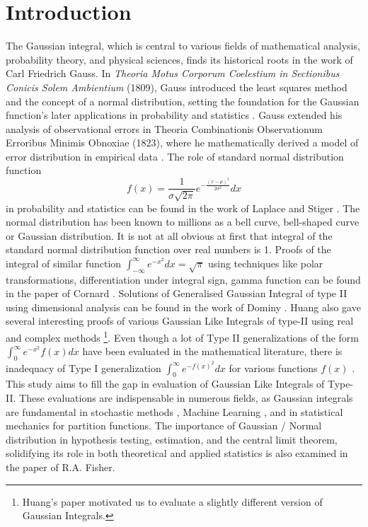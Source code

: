 \documentclass[a4paper,twoside,10pt]{article}
\begin{document}
\section{Introduction}
The Gaussian integral, which is central to various fields of mathematical analysis, probability theory, and physical sciences, finds its historical roots in the work of Carl Friedrich Gauss. In \textit{Theoria Motus Corporum Coelestium in Sectionibus Conicis Solem Ambientium} (1809), Gauss introduced the least squares method and the concept of a normal distribution, setting the foundation for the Gaussian function's later applications in probability and statistics \cite{G1809}. Gauss extended his analysis of observational errors in Theoria Combinationis Observationum Erroribus Minimis Obnoxiae (1823), where he mathematically derived a model of error distribution in empirical data \cite{G1823}. The role of standard normal distribution  function \[ f(x)=\frac{1}{\sigma\sqrt{2\pi}} e^{-\frac{(x-\mu)^2}{2\sigma^2}} dx \] in probability and statistics can be found in the work of Laplace \cite{L1812} and Stiger \cite{S1986}. The normal distribution has been known to millions as a bell curve, bell-shaped curve or Gaussian distribution. It is not at all obvious at first that integral of the standard normal distribution function over real numbers is 1. Proofs of the integral of similar function   $\int_{-\infty}^{\infty} e^{-x^2} dx = \sqrt{\pi}   $ using techniques like polar transformations, differentiation under integral sign, gamma function can be found in the paper of Cornard \cite{C2016}. Solutions of Generalised Gaussian Integral of type II using dimensional analysis can be found in the work of Dominy \cite{Dnd}. Huang also gave several interesting proofs of various Gaussian Like Integrals of type-II using real and complex methods \cite{H2023} \footnote{Huang's paper motivated us to evaluate a slightly different version of Gaussian Integrals.}. Even though a lot of Type II generalizations of the form \( \int_0^{\infty} e^{-x^2} f(x) dx \) have been evaluated  in the mathematical literature, there is inadequacy of Type I generalization \( \int_0^{\infty} e^{-f(x)^2} dx \) for various functions \( f(x) \) . This study aims to fill the gap in evaluation of Gaussian Like Integrals of Type-II.  These evaluations are indispensable in numerous fields, as Gaussian integrals are fundamental in stochastic methods \cite{G2004}, Machine Learning \cite{R2006}, and in statistical mechanics for partition functions\cite{P2011}. The importance of Gaussian / Normal distribution in  hypothesis testing, estimation, and the central limit theorem, solidifying its role in both theoretical and applied statistics is also examined in the paper of R.A. Fisher\cite{F1922}.
 
\end{document}

